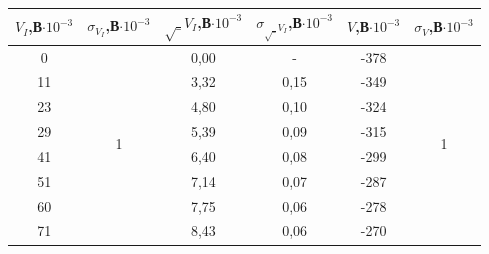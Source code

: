 \documentclass[a4paper,12pt]{report}
\begin{document}
\begin{table}[H]
\begin{tabular}{|c|c|c|c|c|c|}
\hline
$V_{I}$,В$\cdot10^{-3}$ & $\sigma_{V_I}$,В$\cdot10^{-3}$ & $\sqrt_{V_I}$,В$\cdot10^{-3}$ & $\sigma_{\sqrt_{V_I}}$,В$\cdot10^{-3}$ & $V$,В$\cdot10^{-3}$ & $\sigma_{V}$,В$\cdot10^{-3}$ \\ \hline
0                             & \multirow{14}{*}{1}                   & 0,00                              & -                                 & -378                         & \multirow{14}{*}{1}                  \\ \cline{1-1} \cline{3-5}
11                            &                                       & 3,32                              & 0,15                              & -349                         &                                      \\ \cline{1-1} \cline{3-5}
23                            &                                       & 4,80                              & 0,10                              & -324                         &                                      \\ \cline{1-1} \cline{3-5}
29                            &                                       & 5,39                              & 0,09                              & -315                         &                                      \\ \cline{1-1} \cline{3-5}
41                            &                                       & 6,40                              & 0,08                              & -299                         &                                      \\ \cline{1-1} \cline{3-5}
51                            &                                       & 7,14                              & 0,07                              & -287                         &                                      \\ \cline{1-1} \cline{3-5}
60                            &                                       & 7,75                              & 0,06                              & -278                         &                                      \\ \cline{1-1} \cline{3-5}
71                            &                                       & 8,43                              & 0,06                              & -270                         &                                      \\ \cline{1-1} \cline{3-5}

\end{tabular}
\end{table}
\end{document}
